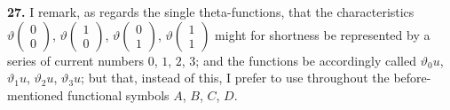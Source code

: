 \documentclass[12pt,a4paper]{article}
\theoremstyle{definition}
\begin{document}
\vspace{0.5em}

\noindent\textbf{27.}\quad
I remark, as regards the single theta-functions, that the characteristics $\vartheta\begin{pmatrix} 0 \\ 0 \end{pmatrix}$, $\vartheta\begin{pmatrix} 1 \\ 0 \end{pmatrix}$, $\vartheta\begin{pmatrix} 0 \\ 1 \end{pmatrix}$, $\vartheta\begin{pmatrix} 1 \\ 1 \end{pmatrix}$ might for shortness be represented by a series of current numbers $0$, $1$, $2$, $3$; and the functions be accordingly called $\vartheta_0 u$, $\vartheta_1 u$, $\vartheta_2 u$, $\vartheta_3 u$; but that, instead of this, I prefer to use throughout the before-mentioned functional symbols $A$, $B$, $C$, $D$.
\end{document}
